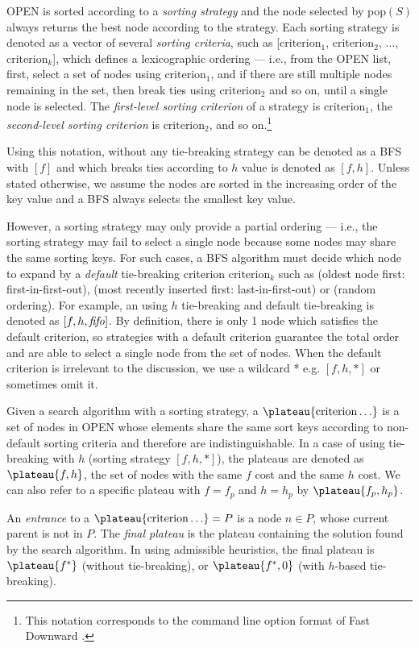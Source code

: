 OPEN is sorted according to a \emph{sorting strategy} and the node selected by pop$(S)$ always returns the best node according to the strategy.
Each sorting strategy is denoted as a vector of several \emph{sorting criteria}, such as
[$\text{criterion}_1$, $\text{criterion}_2$, $\ldots$,
$\text{criterion}_k$], which defines a lexicographic ordering ---
i.e., from the OPEN list, first, select a
set of nodes using $\text{criterion}_1$, and if there are still multiple
nodes remaining in the set, then break ties using $\text{criterion}_2$
and so on, until a single node is selected.  The \emph{first-level
sorting criterion} of a strategy is $\text{criterion}_1$, the
\emph{second-level sorting criterion} is $\text{criterion}_2$, and so on.\footnote{This notation corresponds to the command line option format of Fast
Downward \cite{Helmert2006}.} %


Using this notation, \astar without any tie-breaking strategy can be
denoted as a BFS with $[f]$ and \astar which breaks ties according to $h$
value is denoted as $[f,h]$.
Unless stated otherwise, we assume the nodes are sorted in the
increasing order of the key value and a BFS always selects the smallest
key value.

However, a sorting strategy may only provide a partial ordering ---
i.e., the sorting strategy may fail to select a single node because some nodes
may share the same sorting keys.
For such cases, a BFS algorithm must
decide which node to expand by a \emph{default} tie-breaking
criterion $\text{criterion}_k$ such as  \fifo (oldest node first: first-in-first-out), \lifo
(most recently inserted first: last-in-first-out) or \ro (random ordering).
For example, an \astar using $h$ tie-breaking and \fifo default tie-breaking
 is denoted as $[f,h,{\text{\textit{fifo}}}]$.
By definition, there is only 1 node which satisfies the default criterion, so
strategies with a default criterion guarantee the total order and
are able to select a single node from the set of nodes.
When the default criterion is irrelevant to the discussion,
we use a wildcard * e.g. $[f,h,*]$ or sometimes omit it.

Given a search algorithm with a sorting strategy, 
a $\plateau{\text{criterion}\ldots}$ is a set of nodes in OPEN whose elements share
the same sort keys according to non-default sorting criteria and therefore
are indistinguishable. In a case of \astar
using tie-breaking with $h$ (sorting strategy $[f,h,*]$), the plateaus are denoted as
$\plateau{f,h}$, the set of nodes with the same $f$ cost and the same $h$ cost.
We can also refer to a specific plateau with $f=f_p$ and $h=h_p$ by $\plateau{f_p,h_p}$.

An \emph{entrance} to a $\plateau{\text{criterion}\ldots}=P$ is
a node $n \in P$, whose current parent is not in
$P$. The \emph{final plateau} is the plateau
containing the solution found by the search algorithm.  In \astar using
admissible heuristics, the final plateau is $\plateau{f^*}$ (without
tie-breaking), or $\plateau{f^*,0}$ (with $h$-based tie-breaking).
